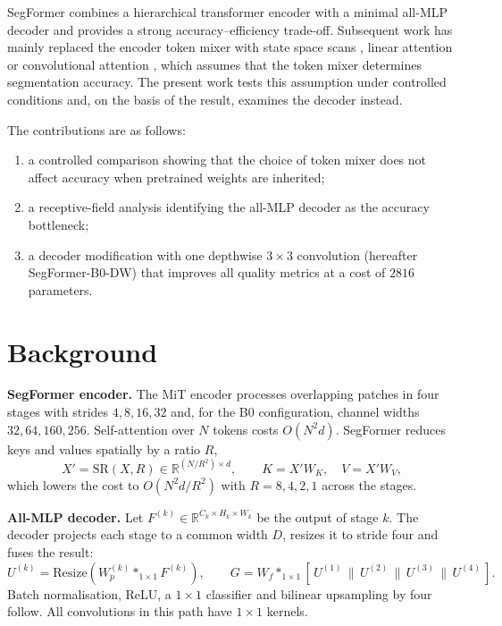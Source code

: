 \documentclass[3p,times,number]{elsarticle}
\begin{document}
SegFormer \cite{segformer} combines a hierarchical transformer encoder with a minimal
all-MLP decoder and provides a strong accuracy--efficiency trade-off. Subsequent work has
mainly replaced the encoder token mixer with state space scans \cite{mamba2}, linear
attention \cite{flatten} or convolutional attention \cite{segnext}, which assumes that the
token mixer determines segmentation accuracy. The present work tests this assumption under
controlled conditions and, on the basis of the result, examines the decoder instead.

The contributions are as follows:
\begin{enumerate}
\item a controlled comparison showing that the choice of token mixer does not affect
accuracy when pretrained weights are inherited;
\item a receptive-field analysis identifying the all-MLP decoder as the accuracy bottleneck;
\item a decoder modification with one depthwise $3 \times 3$ convolution (hereafter
SegFormer-B0-DW) that improves all quality metrics at a cost of $2816$ parameters.
\end{enumerate}

\section{Background}

\textbf{SegFormer encoder.} The MiT encoder \cite{segformer,pvt,pvtv2} processes
overlapping patches in four stages with strides $4, 8, 16, 32$ and, for the B0
configuration, channel widths $32, 64, 160, 256$. Self-attention over $N$ tokens costs
$O(N^2 d)$. SegFormer reduces keys and values spatially by a ratio $R$,
$$
X' = \mathrm{SR}(X, R) \in \mathbb{R}^{(N / R^2) \times d},
\qquad K = X' W_K, \quad V = X' W_V,
$$
which lowers the cost to $O(N^2 d / R^2)$ with $R = 8, 4, 2, 1$ across the stages.

\textbf{All-MLP decoder.} Let $F^{(k)} \in \mathbb{R}^{C_k \times H_k \times W_k}$ be the
output of stage $k$. The decoder projects each stage to a common width $D$, resizes it to
stride four and fuses the result:
$$
U^{(k)} = \mathrm{Resize}\!\left(W^{(k)}_{p} \ast_{1 \times 1} F^{(k)}\right),
\qquad
G = W_{f} \ast_{1 \times 1}
\left[\, U^{(1)} \,\|\, U^{(2)} \,\|\, U^{(3)} \,\|\, U^{(4)} \,\right].
$$
Batch normalisation, ReLU, a $1 \times 1$ classifier and bilinear upsampling by four
follow. All convolutions in this path have $1 \times 1$ kernels.
\end{document}
